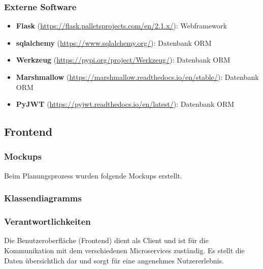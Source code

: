 \subsubsection{Externe Software}
\begin{itemize}
\item \textbf{Flask} (\href{https://flask.palletsprojects.com/en/2.1.x/}{https://flask.palletsprojects.com/en/2.1.x/}): Webframework
\item \textbf{sqlalchemy} (\href{https://www.sqlalchemy.org/}{https://www.sqlalchemy.org/}): Datenbank ORM
\item \textbf{Werkzeug} (\href{https://pypi.org/project/Werkzeug/}{https://pypi.org/project/Werkzeug/}): Datenbank ORM
\item \textbf{Marshmallow} (\href{https://marshmallow.readthedocs.io/en/stable/}{https://marshmallow.readthedocs.io/en/stable/}): Datenbank ORM
\item \textbf{PyJWT} (\href{https://pyjwt.readthedocs.io/en/latest/}{https://pyjwt.readthedocs.io/en/latest/}): Datenbank ORM
\end{itemize}

\newpage

\subsection{Frontend}

\subsubsection{Mockups}

Beim Planungsprozess wurden folgende Mockups erstellt.


\subsubsection{Klassendiagramms}


\subsubsection{Verantwortlichkeiten}

Die Benutzeroberfläche (Frontend) dient als Client und ist für die Kommunikation mit dem verschiedenen Microservices zuständig. Es stellt die Daten übersichtlich dar und sorgt für eine
angenehmes Nutzererlebnis. \\


